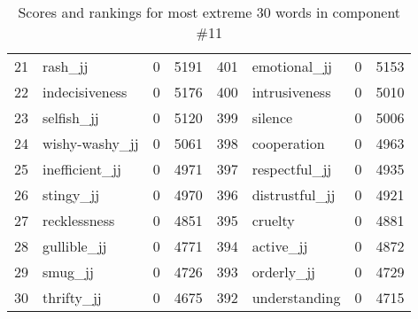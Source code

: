 \begin{table}[tbp]
\begin{tabular}{| rlr@{.}l | rlr@{.}l |}
    21 & rash\_jj & 0 & 5191    &    401 & emotional\_jj & 0 & 5153 \\
    22 & indecisiveness & 0 & 5176    &    400 & intrusiveness & 0 & 5010 \\
    23 & selfish\_jj & 0 & 5120    &    399 & silence & 0 & 5006 \\
    24 & wishy-washy\_jj & 0 & 5061    &    398 & cooperation & 0 & 4963 \\
    25 & inefficient\_jj & 0 & 4971    &    397 & respectful\_jj & 0 & 4935 \\
    26 & stingy\_jj & 0 & 4970    &    396 & distrustful\_jj & 0 & 4921 \\
    27 & recklessness & 0 & 4851    &    395 & cruelty & 0 & 4881 \\
    28 & gullible\_jj & 0 & 4771    &    394 & active\_jj & 0 & 4872 \\
    29 & smug\_jj & 0 & 4726    &    393 & orderly\_jj & 0 & 4729 \\
    30 & thrifty\_jj & 0 & 4675    &    392 & understanding & 0 & 4715 \\
    \hline
    \end{tabular}
    \caption{Scores and rankings for most extreme 30 words in component \#11} 
\end{table}
\clearpage
